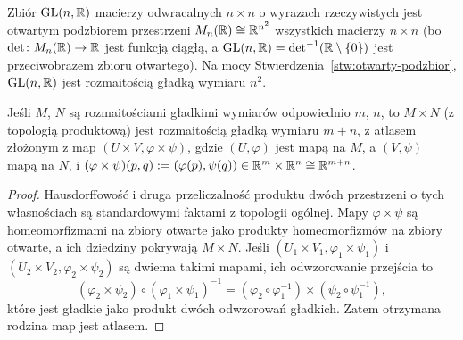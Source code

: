 \begin{przyklad}
Zbiór $\mathrm{GL}(n,\mathbb{R})$ macierzy odwracalnych $n\times n$ o wyrazach rzeczywistych jest
otwartym podzbiorem przestrzeni $M_n(\mathbb{R})\cong\mathbb{R}^{n^2}$ wszystkich macierzy $n\times n$ (bo
$\det\colon M_n(\mathbb{R})\to\mathbb{R}$ jest funkcją ciągłą, a $\mathrm{GL}(n,\mathbb{R})=\det^{-1}(\mathbb{R}\setminus
\{0\})$ jest przeciwobrazem zbioru otwartego). Na mocy Stwierdzenia~\ref{stw:otwarty-podzbior},
$\mathrm{GL}(n,\mathbb{R})$ jest rozmaitością gładką wymiaru $n^2$.
\end{przyklad}

\begin{stwierdzenie}
Jeśli $M$, $N$ są rozmaitościami gładkimi wymiarów odpowiednio $m$, $n$, to $M\times N$
(z topologią produktową) jest rozmaitością gładką wymiaru $m+n$, z atlasem złożonym z map
$(U\times V,\varphi\times\psi)$, gdzie $(U,\varphi)$ jest mapą na $M$, a $(V,\psi)$ mapą na
$N$, i $(\varphi\times\psi)(p,q):=(\varphi(p),\psi(q))\in\mathbb{R}^m\times\mathbb{R}^n\cong\mathbb{R}^{m+n}$.
\end{stwierdzenie}

\begin{proof}
Hausdorffowość i druga przeliczalność produktu dwóch przestrzeni o tych własnościach są
standardowymi faktami z topologii ogólnej. Mapy $\varphi\times\psi$ są homeomorfizmami na
zbiory otwarte jako produkty homeomorfizmów na zbiory otwarte, a ich dziedziny pokrywają
$M\times N$. Jeśli $(U_1\times V_1,\varphi_1\times\psi_1)$ i $(U_2\times V_2,\varphi_2
\times\psi_2)$ są dwiema takimi mapami, ich odwzorowanie przejścia to
\[
(\varphi_2\times\psi_2)\circ(\varphi_1\times\psi_1)^{-1}=(\varphi_2\circ\varphi_1^{-1})
\times(\psi_2\circ\psi_1^{-1}),
\]
które jest gładkie jako produkt dwóch odwzorowań gładkich. Zatem otrzymana rodzina map
jest atlasem.
\end{proof}

